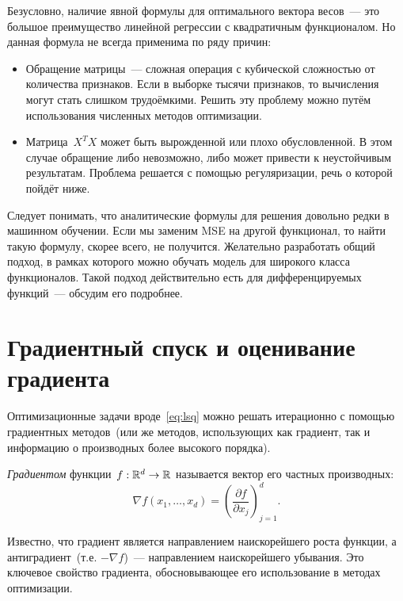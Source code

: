 \documentclass[12pt,fleqn]{article}
\begin{document}
Безусловно, наличие явной формулы для оптимального вектора весов~--- это большое
преимущество линейной регрессии с квадратичным функционалом.
Но данная формула не всегда применима по ряду причин:
\begin{itemize}
    \item Обращение матрицы~--- сложная операция с кубической сложностью от количества признаков.
        Если в выборке тысячи признаков, то вычисления могут стать слишком трудоёмкими.
        Решить эту проблему можно путём использования численных методов оптимизации.
    \item Матрица~$X^T X$ может быть вырожденной или плохо обусловленной.
        В этом случае обращение либо невозможно, либо может привести к неустойчивым результатам.
        Проблема решается с помощью регуляризации, речь о которой пойдёт ниже.
\end{itemize}

Следует понимать, что аналитические формулы для решения довольно редки в машинном обучении.
Если мы заменим MSE на другой функционал, то найти такую формулу, скорее всего, не получится.
Желательно разработать общий подход, в рамках которого можно обучать модель для широкого
класса функционалов.
Такой подход действительно есть для дифференцируемых функций~--- обсудим его подробнее.

\section{Градиентный спуск и оценивание градиента}

Оптимизационные задачи вроде~\eqref{eq:lsq} можно решать итерационно
с помощью градиентных методов~(или же методов, использующих
как градиент, так и информацию о производных более высокого порядка).

\emph{Градиентом} функции~$f: \mathbb{R}^d \to \mathbb{R}$ называется вектор его частных производных:
\[
    \nabla f(x_1, \dots, x_d) = \left( \frac{\partial f}{\partial x_j} \right)_{j = 1}^{d}.
\]

Известно, что градиент является направлением наискорейшего роста функции,
а антиградиент~(т.е. $-\nabla f$)~--- направлением наискорейшего убывания.
Это ключевое свойство градиента, обосновывающее его использование в методах оптимизации.
\end{document}

